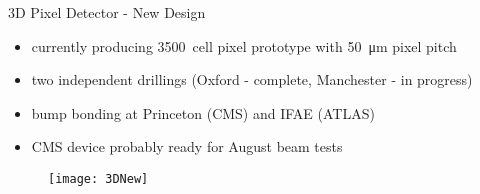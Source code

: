 \begin{frame}{3D Pixel Detector - New Design}

	\vspace*{-5pt}
	\begin{itemize}
		\itemfill
		\item currently producing \SI{3500}{cell} pixel prototype with \SI{50}{\micro\meter} pixel pitch
		\item two independent drillings (Oxford - complete, Manchester - in progress)
		\item bump bonding at Princeton (CMS) and IFAE (ATLAS)
		\item CMS device probably ready for August beam tests
	\end{itemize}\vspace*{-10pt}
	
	\begin{figure}
		\centering 
		\texttt{[image: 3DNew]}
	\end{figure}\vspace*{-15pt}
 	
\end{frame}

